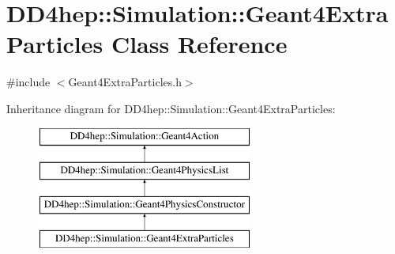 \hypertarget{class_d_d4hep_1_1_simulation_1_1_geant4_extra_particles}{}\section{D\+D4hep\+:\+:Simulation\+:\+:Geant4\+Extra\+Particles Class Reference}
\label{class_d_d4hep_1_1_simulation_1_1_geant4_extra_particles}


{\ttfamily \#include $<$Geant4\+Extra\+Particles.\+h$>$}

Inheritance diagram for D\+D4hep\+:\+:Simulation\+:\+:Geant4\+Extra\+Particles\+:\begin{figure}[H]
\begin{center}
\leavevmode
\includegraphics[height=4.000000cm]{class_d_d4hep_1_1_simulation_1_1_geant4_extra_particles}
\end{center}
\end{figure}
